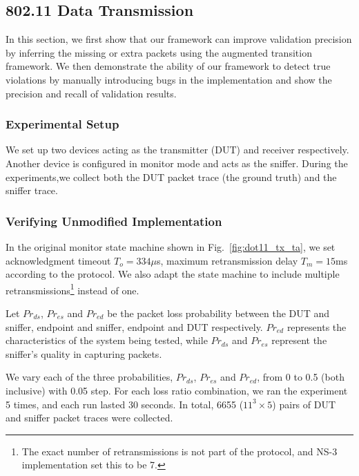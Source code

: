 \subsection{802.11 Data Transmission}
\label{subsec:tx}

In this section, we first show that our framework can improve validation
precision by inferring the missing or extra packets using the augmented
transition framework. We then demonstrate the ability of our framework to detect
true violations by manually introducing bugs in the \ns{} implementation and
show the precision and recall of validation results.


\subsubsection{Experimental Setup}

We set up two \wifi{} devices acting as the transmitter (DUT) and receiver
respectively. Another \wifi{} device is configured in monitor mode and acts as
the sniffer. During the experiments,we collect both the DUT packet trace
(the ground truth) and the sniffer trace.

\subsubsection{Verifying Unmodified Implementation}

In the original monitor state machine shown in Fig.~\ref{fig:dot11_tx_ta}, we
set acknowledgment timeout $T_o=334\mu$s, maximum retransmission delay
$T_m=15$ms according to the protocol. We also adapt the state machine to include
multiple retransmissions\footnote{The exact number of retransmissions is not
part of the protocol, and NS-3 implementation set this to be 7.} instead of one.

Let $Pr_{ds}$, $Pr_{es}$ and $Pr_{ed}$ be the packet loss probability between
the DUT and sniffer, endpoint and sniffer, endpoint and DUT respectively.
$Pr_{ed}$ represents the characteristics of the system being tested, while
$Pr_{ds}$ and $Pr_{es}$ represent the sniffer's quality in capturing packets.



We vary each of the three probabilities, $Pr_{ds}$, $Pr_{es}$ and $Pr_{ed}$, from
0 to 0.5 (both inclusive) with 0.05 step.  For each loss ratio combination, we
ran the experiment 5 times, and each run lasted
30 seconds. In total, 6655 ($11^3\times 5$) pairs of DUT and sniffer packet
traces were collected.

